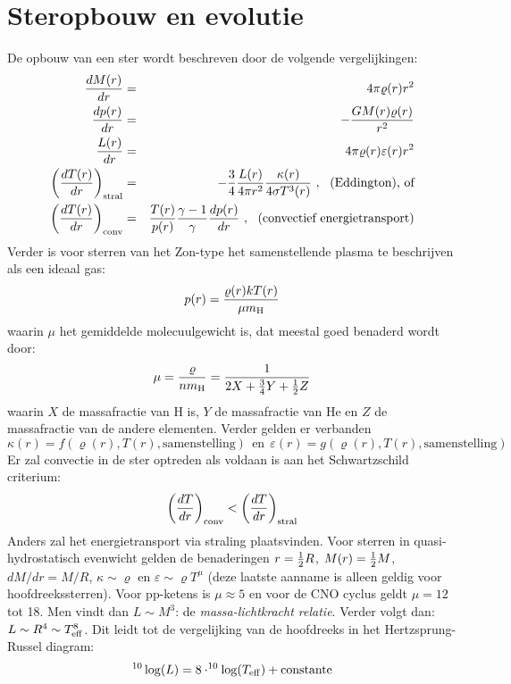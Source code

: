 \section{Steropbouw en evolutie}
De opbouw van een ster wordt beschreven door de volgende vergelijkingen:
\begin{eqnarray*}
\frac{dM(r)}{dr}&=&4\pi\varrho(r)r^2\\
\frac{dp(r)}{dr}&=&-\frac{GM(r)\varrho(r)}{r^2}\\
\frac{L(r)}{dr}&=&4\pi\varrho(r)\varepsilon(r)r^2\\
\left(\frac{dT(r)}{dr}\right)_{\rm stral}&=&-\frac{3}{4}\frac{L(r)}{4\pi r^2}\frac{\kappa(r)}{4\sigma T^3(r)}~,~~\mbox{(Eddington), of}\\
\left(\frac{dT(r)}{dr}\right)_{\rm conv}&=&\frac{T(r)}{p(r)}\frac{\gamma-1}{\gamma}\frac{dp(r)}{dr}~,~~\mbox{(convectief energietransport)}
\end{eqnarray*}
Verder is voor sterren van het Zon-type het samenstellende plasma te
beschrijven als een ideaal gas:
\[
p(r)=\frac{\varrho(r)kT(r)}{\mu m_{\rm H}}
\]
waarin $\mu$ het gemiddelde molecuulgewicht is, dat meestal goed benaderd
wordt door:
\[
\mu=\frac{\varrho}{nm_{\rm H}}=\frac{1}{2X+\frac{3}{4}Y+\mbox{$\frac{1}{2}$} Z}
\]
waarin $X$ de massafractie van H is, $Y$ de massafractie van He en $Z$ de
massafractie van de andere elementen. Verder gelden er verbanden
\[
\kappa(r)=f(\varrho(r),T(r),\mbox{samenstelling})~~\mbox{en}~~
\varepsilon(r)=g(\varrho(r),T(r),\mbox{samenstelling})
\]
Er zal convectie in de ster optreden als voldaan is aan het Schwartzschild
criterium:
\[
\left(\frac{dT}{dr}\right)_{\rm conv}<\left(\frac{dT}{dr}\right)_{\rm stral}
\]
Anders zal het energietransport via straling plaatsvinden. Voor sterren in
quasi-hydrostatisch evenwicht gelden de benaderingen $r=\mbox{$\frac{1}{2}$} R$,
$M(r)=\mbox{$\frac{1}{2}$} M$, $dM/dr=M/R$, $\kappa\sim\varrho$ en $\varepsilon\sim\varrho T^\mu$
(deze laatste aanname is alleen geldig voor hoofdreekssterren). Voor pp-ketens
is $\mu\approx5$ en voor de CNO cyclus geldt $\mu=12$ tot 18. Men vindt dan
$L\sim M^3$: de {\it massa-lichtkracht relatie}. Verder volgt dan:
$L\sim R^4\sim T^8_{\rm eff}$. Dit leidt tot de vergelijking van de
hoofdreeks in het Hertzsprung-Russel diagram:
\[
^{10}\log(L)=8\cdot^{10}\log(T_{\rm eff})+\mbox{constante}
\]

